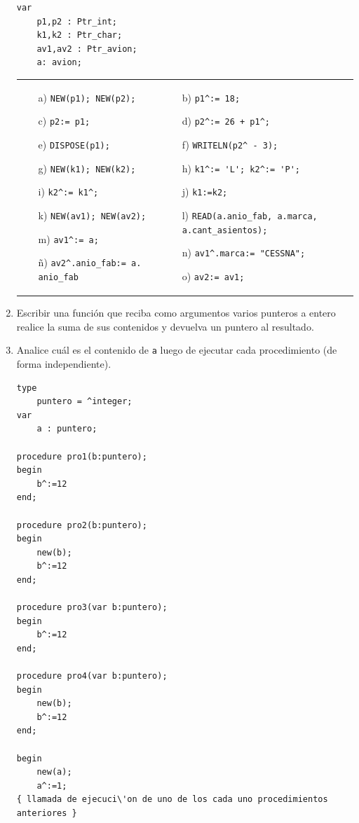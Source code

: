 \documentclass[a4paper,10pt]{article}
\begin{document}
\begin{enumerate}
\begin{small}
\begin{verbatim}
var
    p1,p2 : Ptr_int;
    k1,k2 : Ptr_char;
    av1,av2 : Ptr_avion;
    a: avion;
\end{verbatim}
\begin{tabular}{p{} p{}}
\begin{itemize}
    \item[a)] \verb-NEW(p1); NEW(p2);-			
    \item[c)] \verb-p2:= p1;-					
    \item[e)] \verb-DISPOSE(p1);-				
    \item[g)] \verb-NEW(k1); NEW(k2);-			
    \item[i)] \verb-k2^:= k1^;-				
    \item[k)] \verb-NEW(av1); NEW(av2);-		
    \item[m)] \verb-av1^:= a;-					
    \item[\~n)] \verb-av2^.anio_fab:= a. anio_fab-			
\end{itemize}
&
\begin{itemize}
  \item[b)] \verb-p1^:= 18;-
  \item[d)] \verb-p2^:= 26 + p1^;-
  \item[f)] \verb+WRITELN(p2^ - 3);+
  \item[h)] \verb-k1^:= 'L'; k2^:= 'P';-
  \item[j)] \verb-k1:=k2;-
  \item[l)] \verb-READ(a.anio_fab, a.marca, a.cant_asientos);-
  \item[n)] \verb-av1^.marca:= "CESSNA";-
  \item[o)] \verb-av2:= av1;-
\end{itemize}
\end{tabular}
\end{small}

\item Escribir una funci\'on que reciba como argumentos varios punteros a entero realice la suma de sus contenidos y devuelva un puntero al resultado.

\item Analice cu\'al es el contenido de \verb-a- luego de ejecutar cada procedimiento (de forma independiente).
\begin{small}
\begin{verbatim}
type
    puntero = ^integer;
var
    a : puntero;

procedure pro1(b:puntero);
begin
    b^:=12
end;

procedure pro2(b:puntero);
begin
    new(b);
    b^:=12
end;

procedure pro3(var b:puntero);
begin
    b^:=12
end;

procedure pro4(var b:puntero);
begin
    new(b);
    b^:=12
end;

begin
    new(a);
    a^:=1;
{ llamada de ejecuci\'on de uno de los cada uno procedimientos anteriores }
\end{verbatim}
\end{small}


\end{enumerate}
\end{document}
